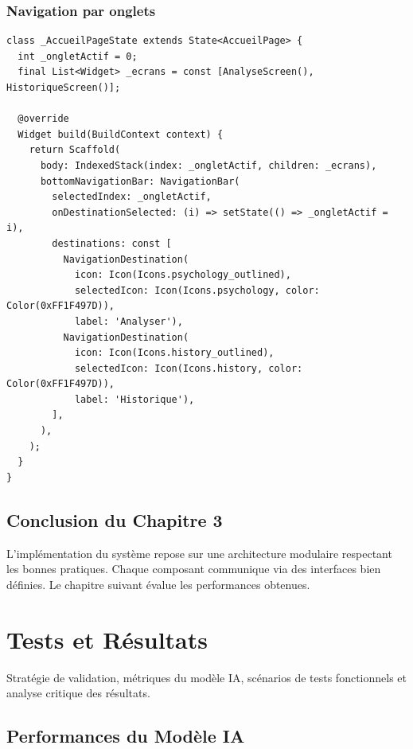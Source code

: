 \documentclass[12pt,a4paper,oneside]{report}
\begin{document}
\subsection{Navigation par onglets}

\begin{lstlisting}[style=styleDart,caption={Navigation IndexedStack},label={lst:nav}]
class _AccueilPageState extends State<AccueilPage> {
  int _ongletActif = 0;
  final List<Widget> _ecrans = const [AnalyseScreen(), HistoriqueScreen()];

  @override
  Widget build(BuildContext context) {
    return Scaffold(
      body: IndexedStack(index: _ongletActif, children: _ecrans),
      bottomNavigationBar: NavigationBar(
        selectedIndex: _ongletActif,
        onDestinationSelected: (i) => setState(() => _ongletActif = i),
        destinations: const [
          NavigationDestination(
            icon: Icon(Icons.psychology_outlined),
            selectedIcon: Icon(Icons.psychology, color: Color(0xFF1F497D)),
            label: 'Analyser'),
          NavigationDestination(
            icon: Icon(Icons.history_outlined),
            selectedIcon: Icon(Icons.history, color: Color(0xFF1F497D)),
            label: 'Historique'),
        ],
      ),
    );
  }
}
\end{lstlisting}

\section*{Conclusion du Chapitre 3}
L'implémentation du système repose sur une architecture modulaire respectant
les bonnes pratiques. Chaque composant communique via des interfaces bien
définies. Le chapitre suivant évalue les performances obtenues.
\cleardoublepage

\chapter{Tests et Résultats}

\begin{infobox}
Stratégie de validation, métriques du modèle IA, scénarios de tests
fonctionnels et analyse critique des résultats.
\end{infobox}

\section{Performances du Modèle IA}
\end{document}
